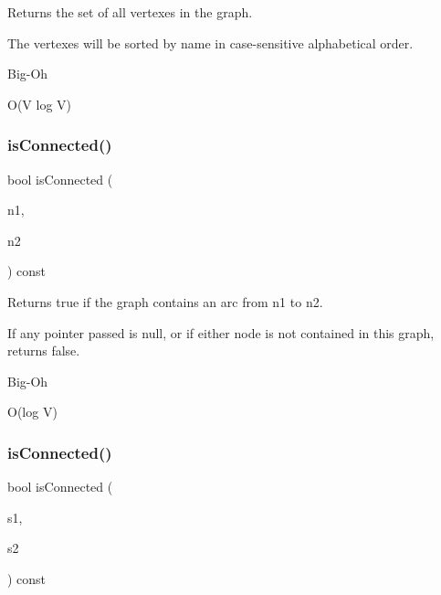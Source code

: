 Returns the set of all vertexes in the graph. 

The vertexes will be sorted by name in case-\/sensitive alphabetical order. \begin{DoxyRefDesc}{Big-\/\+Oh}
\item[\mbox{\hyperlink{BigOh__BigOh000028}{Big-\/\+Oh}}]O(\+V log V) \end{DoxyRefDesc}
\mbox{\label{classGraph_a54164ab847f3a5c7fe15d15ac95af443}} 
\subsubsection{\texorpdfstring{is\+Connected()}{isConnected()}\hspace{0.1cm}{\footnotesize\ttfamily [1/2]}}
{\footnotesize\ttfamily bool is\+Connected (\begin{DoxyParamCaption}\item[{\mbox{\hyperlink{classVertexGen}{Vertex\+Gen}}$<$ V, E $>$  $\ast$}]{n1,  }\item[{\mbox{\hyperlink{classVertexGen}{Vertex\+Gen}}$<$ V, E $>$  $\ast$}]{n2 }\end{DoxyParamCaption}) const\hspace{0.3cm}{\ttfamily [inherited]}}



Returns {\ttfamily true} if the graph contains an arc from {\ttfamily n1} to {\ttfamily n2}. 

If any pointer passed is null, or if either node is not contained in this graph, returns false. \begin{DoxyRefDesc}{Big-\/\+Oh}
\item[\mbox{\hyperlink{BigOh__BigOh000078}{Big-\/\+Oh}}]O(log V) \end{DoxyRefDesc}
\mbox{\label{classGraph_a3623b7decbedc522041c2c39d3b14421}} 
\subsubsection{\texorpdfstring{is\+Connected()}{isConnected()}\hspace{0.1cm}{\footnotesize\ttfamily [2/2]}}
{\footnotesize\ttfamily bool is\+Connected (\begin{DoxyParamCaption}\item[{const std\+::string \&}]{s1,  }\item[{const std\+::string \&}]{s2 }\end{DoxyParamCaption}) const\hspace{0.3cm}{\ttfamily [inherited]}}




